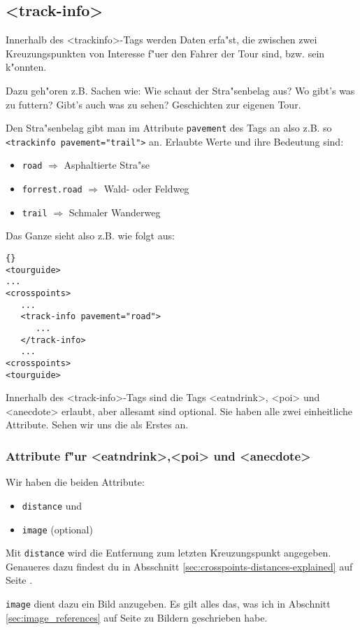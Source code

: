 \subsection{<track-info>}
Innerhalb des <trackinfo>-Tags werden Daten erfa"st, die zwischen
zwei Kreu\-zungs\-punkten von Interesse f"uer den Fahrer der Tour sind,
bzw. sein k"onnten.

Dazu geh"oren z.B. Sachen wie: Wie schaut der Stra"senbelag aus?
Wo gibt's was zu futtern? Gibt's auch was zu sehen? Geschichten zur 
eigenen Tour.

Den Stra"senbelag gibt man im Attribute \texttt{pavement} des
Tags an also z.B. so \texttt{<trackinfo pavement="trail">} an.
Erlaubte Werte und ihre Bedeutung sind:
\begin{itemize}
\item \texttt{road} $\Rightarrow$ Asphaltierte Stra"se
\item \texttt{forrest.road} $\Rightarrow$ Wald- oder Feldweg
\item \texttt{trail} $\Rightarrow$ Schmaler Wanderweg
\end{itemize}

Das Ganze sieht also z.B. wie folgt aus:
\begin{lstlisting}{}
<tourguide>
...
<crosspoints>
   ...
   <track-info pavement="road">
      ...
   </track-info>
   ...
<crosspoints>
<tourguide>
\end{lstlisting}

Innerhalb des <track-info>-Tags sind die Tags <eatndrink>, <poi> 
und <anecdote> erlaubt, aber allesamt sind optional. Sie haben alle 
zwei einheitliche Attribute. Sehen wir uns die als Erstes an.

\subsubsection{Attribute f"ur <eatndrink>,<poi> und <anecdote>}
Wir haben die beiden Attribute:
\begin{itemize}
\item \texttt{distance} und
\item \texttt{image} (optional)
\end{itemize}

Mit \texttt{distance} wird die Entfernung zum letzten Kreuzungspunkt
angegeben. Genaueres dazu findest du in Absschnitt 
\ref{sec:crosspoints-distances-explained} auf Seite 
\pageref{sec:crosspoints-distances-explained}.

\texttt{image} dient dazu ein Bild anzugeben. Es gilt alles
das, was ich in Abschnitt \ref{sec:image_references} auf Seite
\pageref{sec:image_references} zu Bildern geschrieben
habe.


